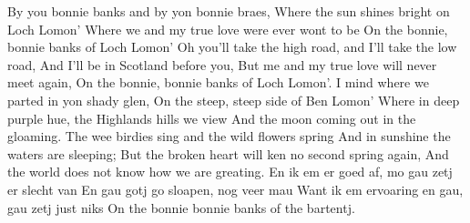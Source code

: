\beginverse*
By you bonnie banks and by yon bonnie braes,
Where the sun shines bright on Loch Lomon’
Where we and my true love were ever wont to be
On the bonnie, bonnie banks of Loch Lomon’
\endverse
\beginchorus
Oh you’ll take the high road, and I’ll take the low road,
And I’ll be in Scotland before you,
But me and my true love will never meet again,
On the bonnie, bonnie banks of Loch Lomon’.
\endchorus
\beginverse*
I mind where we parted in yon shady glen,
On the steep, steep side of Ben Lomon’
Where in deep purple hue, the Highlands hills we view
And the moon coming out in the gloaming. 
The wee birdies sing and the wild flowers spring
And in sunshine the waters are sleeping;
But the broken heart will ken no second spring again,
And the world does not know how we are greating. 
\endverse
\beginverse*
En ik em er goed af, mo gau zetj er slecht van
En gau gotj go sloapen, nog veer mau
Want ik em ervoaring en gau, gau zetj just niks
On the bonnie bonnie banks of the bartentj.
\endverse
\endsong